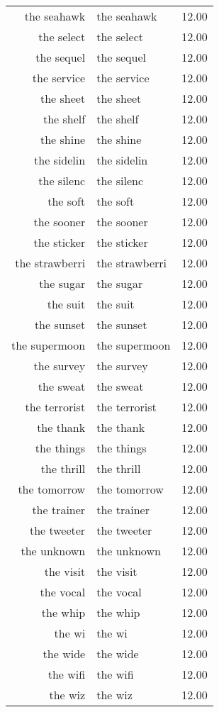\begin{table}[ht]
\begin{tabular}{rlr}
  the seahawk & the seahawk & 12.00 \\ 
  the select & the select & 12.00 \\ 
  the sequel & the sequel & 12.00 \\ 
  the service & the service & 12.00 \\ 
  the sheet & the sheet & 12.00 \\ 
  the shelf & the shelf & 12.00 \\ 
  the shine & the shine & 12.00 \\ 
  the sidelin & the sidelin & 12.00 \\ 
  the silenc & the silenc & 12.00 \\ 
  the soft & the soft & 12.00 \\ 
  the sooner & the sooner & 12.00 \\ 
  the sticker & the sticker & 12.00 \\ 
  the strawberri & the strawberri & 12.00 \\ 
  the sugar & the sugar & 12.00 \\ 
  the suit & the suit & 12.00 \\ 
  the sunset & the sunset & 12.00 \\ 
  the supermoon & the supermoon & 12.00 \\ 
  the survey & the survey & 12.00 \\ 
  the sweat & the sweat & 12.00 \\ 
  the terrorist & the terrorist & 12.00 \\ 
  the thank & the thank & 12.00 \\ 
  the things & the things & 12.00 \\ 
  the thrill & the thrill & 12.00 \\ 
  the tomorrow & the tomorrow & 12.00 \\ 
  the trainer & the trainer & 12.00 \\ 
  the tweeter & the tweeter & 12.00 \\ 
  the unknown & the unknown & 12.00 \\ 
  the visit & the visit & 12.00 \\ 
  the vocal & the vocal & 12.00 \\ 
  the whip & the whip & 12.00 \\ 
  the wi & the wi & 12.00 \\ 
  the wide & the wide & 12.00 \\ 
  the wifi & the wifi & 12.00 \\ 
  the wiz & the wiz & 12.00 \\ 

\end{tabular}
\end{table}
